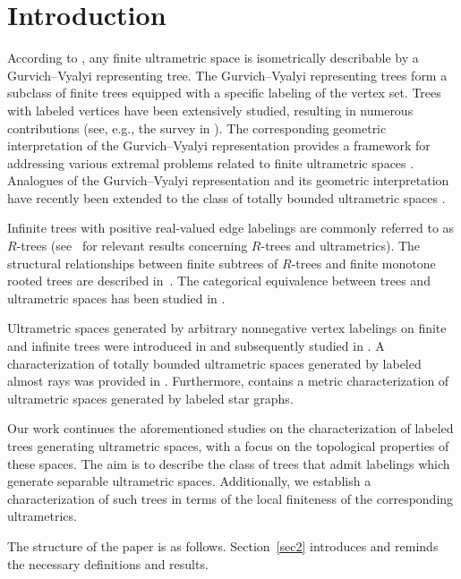 \documentclass[pdflatex,sn-mathphys-num]{sn-jnl}%
\theoremstyle{thmstyletwo}%
\begin{document}
\section{Introduction}



According to \cite{GV}, any finite ultrametric space is isometrically describable by a Gurvich--Vyalyi representing tree.  The
Gurvich--Vyalyi representing trees form a subclass of finite trees equipped with a specific labeling of the vertex set.  Trees with labeled vertices have been extensively studied, resulting in numerous contributions (see, e.g., the survey in \cite{Gallian2024}). The corresponding geometric interpretation of the Gurvich--Vyalyi representation \cite{PD2014JMS} provides a framework for addressing various extremal problems related to finite ultrametric spaces \cite{DP2020pNUAA,DPT2016,DPT2017FPTA}.
Analogues of the Gurvich--Vyalyi representation and its geometric interpretation have recently been extended to the class of totally bounded ultrametric spaces \cite{Dovg2025}.


Infinite trees with positive real-valued edge labelings are commonly referred to as \(R\)-trees (see~\cite{Ber2019SMJ} for relevant results concerning \(R\)-trees and ultrametrics). The structural relationships between finite subtrees of \(R\)-trees and finite monotone rooted trees are described in~\cite{Dov2020TaAoG}. The categorical equivalence between trees and ultrametric spaces has been studied in \cite{H04,Lem2003AU}.


Ultrametric spaces generated by arbitrary nonnegative vertex labelings on finite and infinite trees were introduced in \cite{Dov2020TaAoG} and subsequently studied in \cite{DK2024DLPSSAG,DK2022LTGCCaDUS}.  
A characterization of totally bounded ultrametric spaces generated by labeled almost rays was provided in \cite{DV2025JMS}. Furthermore, \cite{DR2025USGbLSG} contains a metric characterization of ultrametric spaces generated by labeled star graphs.

Our work continues the aforementioned studies on the characterization of labeled trees generating ultrametric spaces, with a focus on the topological properties of these spaces.
The aim is to describe the class of trees that admit labelings which generate separable ultrametric spaces. Additionally, we establish a characterization of such trees in terms of the local finiteness of the corresponding ultrametrics.


The structure of the paper is as follows. Section~\ref{sec2} introduces and reminds the necessary definitions and results. 
\end{document}
